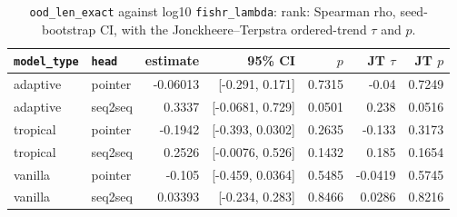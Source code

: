 \documentclass[10pt]{article}
\begin{document}
{\small
\begin{longtable}{llrrrrr}
\caption{\texttt{ood\_len\_exact} against log10 \texttt{fishr\_lambda}: rank: Spearman rho, seed-bootstrap CI, with the Jonckheere--Terpstra ordered-trend $\tau$ and $p$.}\label{tab:trend-ood_len_exact}\\
\toprule
\texttt{model\_type} & \texttt{head} & estimate & 95\% CI & $p$ & JT $\tau$ & JT $p$\\
\midrule
\endhead
adaptive & pointer & -0.06013 & [-0.291, 0.171] & 0.7315 & -0.04 & 0.7249\\
adaptive & seq2seq & 0.3337 & [-0.0681, 0.729] & 0.0501 & 0.238 & 0.0516\\
tropical & pointer & -0.1942 & [-0.393, 0.0302] & 0.2635 & -0.133 & 0.3173\\
tropical & seq2seq & 0.2526 & [-0.0076, 0.526] & 0.1432 & 0.185 & 0.1654\\
vanilla & pointer & -0.105 & [-0.459, 0.0364] & 0.5485 & -0.0419 & 0.5745\\
vanilla & seq2seq & 0.03393 & [-0.234, 0.283] & 0.8466 & 0.0286 & 0.8216\\
\bottomrule
\end{longtable}
}
\end{document}
